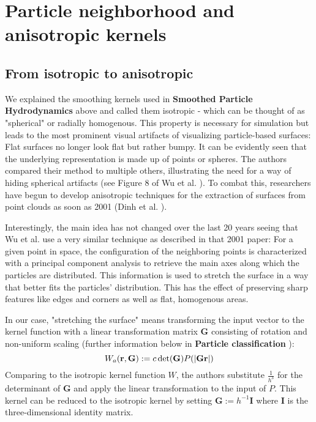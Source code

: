 %
\chapter{Particle neighborhood and anisotropic kernels}
\label{sec:particleneighborhood}

\section{From isotropic to anisotropic}

We explained the smoothing kernels used in \textbf{Smoothed Particle Hydrodynamics } above and called them isotropic - which can be thought of as "spherical" or radially homogenous. This property is necessary for simulation but leads to the most prominent visual artifacts of visualizing particle-based surfaces: Flat surfaces no longer look flat but rather bumpy. It can be evidently seen that the underlying representation is made up of points or spheres. The authors compared their method to multiple others, illustrating the need for a way of hiding spherical artifacts (see Figure 8 of Wu et al. \cite{Wu:2022}). To combat this, researchers have begun to develop anisotropic techniques for the extraction of surfaces from point clouds as soon as 2001 (Dinh et al. \cite{Dinh:2001}).

Interestingly, the main idea has not changed over the last 20 years seeing that Wu et al. use a very similar technique as described in that 2001 paper:
For a given point in space, the configuration of the neighboring points is characterized with a principal component analysis to retrieve the main axes along which the particles are distributed. This information is used to stretch the surface in a way that better fits the particles' distribution. This has the effect of preserving sharp features like edges and corners as well as flat, homogenous areas.

In our case, "stretching the surface" means transforming the input vector to the kernel function with a linear transformation matrix $\textbf{G}$ consisting of rotation and non-uniform scaling (further information below in \textbf{Particle classification }):
\[
W_{a} ( \textbf{r}, \textbf{G} ) :=
c \space \det (\textbf{G}) \space P ( | \textbf{G} \textbf{r} | )
\]
Comparing to the isotropic kernel function $W$, the authors substitute $\frac{1}{h^3}$ for the determinant of $\textbf{G}$ and apply the linear transformation to the input of $P$.
This kernel can be reduced to the isotropic kernel by setting $\textbf{G} := h^{-1} \textbf{I}$ where $\textbf{I}$ is the three-dimensional identity matrix.

